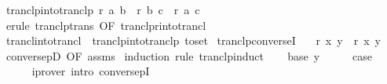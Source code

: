 \begin{isabellebody}
\isanewline
{}\isamarkupfalse%
\ tranclp{\isacharunderscore}{\kern0pt}into{\isacharunderscore}{\kern0pt}tranclp{}{\isacharcolon}{\kern0pt}\ {\isachardoublequoteopen}r\ a\ b\ {\isasymLongrightarrow}\ r\isactrlsup {\isacharplus}{\kern0pt}\isactrlsup {\isacharplus}{\kern0pt}\ b\ c\ {\isasymLongrightarrow}\ r\isactrlsup {\isacharplus}{\kern0pt}\isactrlsup {\isacharplus}{\kern0pt}\ a\ c{\isachardoublequoteclose}\isanewline
%
\isadelimproof
\ \ %
\endisadelimproof
%
\isatagproof
{}\isamarkupfalse%
\ {\isacharparenleft}{\kern0pt}erule\ tranclp{\isacharunderscore}{\kern0pt}trans\ {\isacharbrackleft}{\kern0pt}OF\ tranclp{\isachardot}{\kern0pt}r{\isacharunderscore}{\kern0pt}into{\isacharunderscore}{\kern0pt}trancl{\isacharbrackright}{\kern0pt}{\isacharparenright}{\kern0pt}%
\endisatagproof
{\isafoldproof}%
%
\isadelimproof
\isanewline
%
\endisadelimproof
\isanewline
{}\isamarkupfalse%
\ trancl{\isacharunderscore}{\kern0pt}into{\isacharunderscore}{\kern0pt}trancl{}\ {\isacharequal}{\kern0pt}\ tranclp{\isacharunderscore}{\kern0pt}into{\isacharunderscore}{\kern0pt}tranclp{}\ {\isacharbrackleft}{\kern0pt}to{\isacharunderscore}{\kern0pt}set{\isacharbrackright}{\kern0pt}\isanewline
\isanewline
{}\isamarkupfalse%
\ tranclp{\isacharunderscore}{\kern0pt}converseI{\isacharcolon}{\kern0pt}\isanewline
\ \ \ {\isachardoublequoteopen}{\isacharparenleft}{\kern0pt}r\isactrlsup {\isacharplus}{\kern0pt}\isactrlsup {\isacharplus}{\kern0pt}{\isacharparenright}{\kern0pt}{\isasyminverse}{\isasyminverse}\ x\ y{\isachardoublequoteclose}\ \ {\isachardoublequoteopen}{\isacharparenleft}{\kern0pt}r{\isasyminverse}{\isasyminverse}{\isacharparenright}{\kern0pt}\isactrlsup {\isacharplus}{\kern0pt}\isactrlsup {\isacharplus}{\kern0pt}\ x\ y{\isachardoublequoteclose}\isanewline
%
\isadelimproof
\ \ %
\endisadelimproof
%
\isatagproof
{}\isamarkupfalse%
\ conversepD\ {\isacharbrackleft}{\kern0pt}OF\ assms{\isacharbrackright}{\kern0pt}\isanewline
{}\isamarkupfalse%
\ {\isacharparenleft}{\kern0pt}induction\ rule{\isacharcolon}{\kern0pt}\ tranclp{\isacharunderscore}{\kern0pt}induct{\isacharparenright}{\kern0pt}\isanewline
\ \ \isamarkupfalse%
\ {\isacharparenleft}{\kern0pt}base\ y{\isacharparenright}{\kern0pt}\isanewline
\ \ \isamarkupfalse%
\ \isamarkupfalse%
\ {\isacharquery}{\kern0pt}case\ \isanewline
\ \ \ \ \isamarkupfalse%
\ {\isacharparenleft}{\kern0pt}iprover\ intro{\isacharcolon}{\kern0pt}\ conversepI{\isacharparenright}{\kern0pt}\isanewline

\end{isabellebody}
